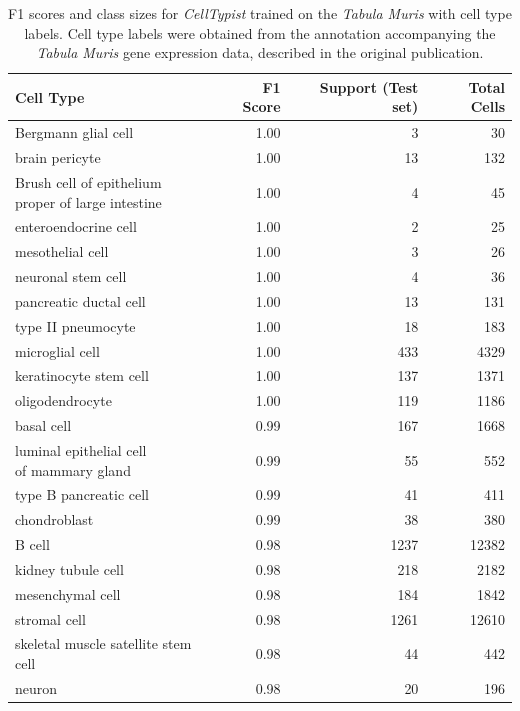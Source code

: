 \begin{table}[pht!]
\small
\caption[F1 scores and class sizes for \textit{CellTypist} trained on the \textit{Tabula Muris} with cell type labels]{F1 scores and class sizes for \textit{CellTypist} trained on the \textit{Tabula Muris} with cell type labels. Cell type labels were obtained from the annotation accompanying the \textit{Tabula Muris} gene expression data, described in the original publication.}
\centering
\label{table:tab_tmmodelcells}

\begin{tabular}{lrrr}
  \toprule
Cell Type & F1 Score & Support (Test set) & Total Cells \\ 
  \midrule
Bergmann glial cell & 1.00 &   3 &  30 \\ 
  brain pericyte & 1.00 &  13 & 132 \\ 
  \specialcell[t]{Brush cell of epithelium\\proper of large intestine} & 1.00 &   4 &  45 \\ 
  enteroendocrine cell & 1.00 &   2 &  25 \\ 
  mesothelial cell & 1.00 &   3 &  26 \\ 
  neuronal stem cell & 1.00 &   4 &  36 \\ 
  pancreatic ductal cell & 1.00 &  13 & 131 \\ 
  type II pneumocyte & 1.00 &  18 & 183 \\ 
  microglial cell & 1.00 & 433 & 4329 \\ 
  keratinocyte stem cell & 1.00 & 137 & 1371 \\ 
  oligodendrocyte & 1.00 & 119 & 1186 \\ 
  basal cell & 0.99 & 167 & 1668 \\ 
  \specialcell[t]{luminal epithelial cell\\of mammary gland} & 0.99 &  55 & 552 \\ 
  type B pancreatic cell & 0.99 &  41 & 411 \\ 
  chondroblast & 0.99 &  38 & 380 \\ 
  B cell & 0.98 & 1237 & 12382 \\ 
  kidney tubule cell & 0.98 & 218 & 2182 \\ 
  mesenchymal cell & 0.98 & 184 & 1842 \\ 
  stromal cell & 0.98 & 1261 & 12610 \\ 
  skeletal muscle satellite stem cell & 0.98 &  44 & 442 \\ 
  neuron & 0.98 &  20 & 196 \\ 

\end{tabular}
\end{table}
